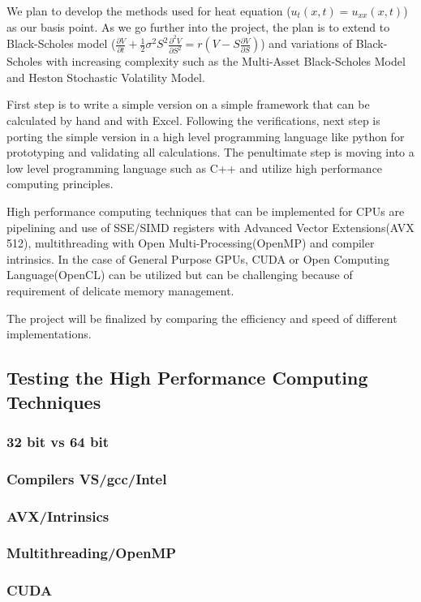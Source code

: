 \documentclass[12pt, oneside]{book}
\theoremstyle{plain}
\theoremstyle{definition}
\begin{document}
We plan to develop the methods used for heat equation (${u_t(x,t)=u_{xx}(x,t)}$) as our basis point. As we go further into the project, the plan is to extend to Black-Scholes model ($\frac{\partial V}{\partial t} + \frac{1}{2}\sigma^2 S^2 \frac{\partial^2 V}{\partial S^2} = r(V - S \frac{\partial V}{\partial S})$)  and variations of Black-Scholes with increasing complexity such as the Multi-Asset Black-Scholes Model and Heston Stochastic Volatility Model.

First step is to write a simple version on a simple framework that can be calculated by hand and with Excel. Following the verifications, next step is porting the simple version in a high level programming language like python for prototyping and validating all calculations. The penultimate step is moving into a low level programming language such as C++ and utilize high performance computing principles.

High performance computing techniques that can be implemented for CPUs are pipelining and use of SSE/SIMD\cite{kusswurm} registers with Advanced Vector Extensions(AVX 512), multithreading with Open Multi-Processing(OpenMP) and compiler intrinsics. In the case of General Purpose GPUs, CUDA or Open Computing Language(OpenCL) can be utilized but can be challenging because of requirement of delicate memory management.

The project will be finalized by comparing the efficiency and speed of different implementations.


\subsection{Testing the High Performance Computing Techniques}
\subsubsection{32 bit vs 64 bit}
\lipsum[5]
\subsubsection{Compilers VS/gcc/Intel}
\lipsum[5]
\subsubsection{AVX/Intrinsics}
\lipsum[5]
\subsubsection{Multithreading/OpenMP}
\lipsum[5]	
\subsubsection{CUDA}
\lipsum[5]	
\end{document}
